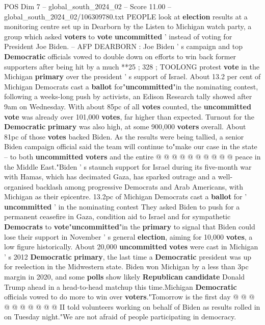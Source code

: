\begin{textsample}{POS Dim 7 – global\_south\_2024\_02 – Score 11.00 – global\_south\_2024\_02/106309780.txt}  \label{ex:f7_pos_197}
PEOPLE look at \textbf{election} results at a monitoring centre set up in Dearborn by the Listen to Michigan watch party, a group which asked \textbf{voters} to \textbf{vote} \textbf{uncommitted} ' instead of voting for President Joe Biden. -- AFP DEARBORN : Joe Biden ' s campaign and top \textbf{Democratic} officials vowed to double down on efforts to win back former supporters after being hit by a much **25 ; 328 ; TOOLONG protest \textbf{vote} in the Michigan \textbf{primary} over the president ' s support of Israel.
About 13.2 per cent of Michigan Democrats cast a \textbf{ballot} for"\textbf{uncommitted}"in the nominating contest, following a weeks-long push by activists, an Edison Research tally showed after 9am on Wednesday.
With about 85pc of all \textbf{votes} counted, the \textbf{uncommitted} \textbf{vote} was already over 101,000 \textbf{votes}, far higher than expected.
Turnout for the \textbf{Democratic} \textbf{primary} was also high, at some 900,000 \textbf{voters} overall.
About 81pc of those \textbf{votes} backed Biden.
As the results were being tallied, a senior Biden campaign official said the team will continue to"make our case in the state -- to both \textbf{uncommitted} \textbf{voters} and the entire @ @ @ @ @ @ @ @ @ @ peace in the Middle East."Biden ' s staunch support for Israel during its five-month war with Hamas, which has decimated Gaza, has sparked outrage and a well-organised backlash among progressive Democrats and Arab Americans, with Michigan as their epicentre. 13.2pc of Michigan Democrats cast a \textbf{ballot} for ' \textbf{uncommitted} ' in the nominating contest They asked Biden to push for a permanent ceasefire in Gaza, condition aid to Israel and for sympathetic \textbf{Democrats} to \textbf{vote}"\textbf{uncommitted}"in the \textbf{primary} to signal that Biden could lose their support in November ' s general \textbf{election}, aiming for 10,000 \textbf{votes}, a low figure historically.
About 20,000 \textbf{uncommitted} \textbf{votes} were cast in Michigan ' s 2012 \textbf{Democratic} \textbf{primary}, the last time a \textbf{Democratic} president was up for reelection in the Midwestern state.
Biden won Michigan by a less than 3pc margin in 2020, and some \textbf{polls} show likely \textbf{Republican} \textbf{candidate} Donald Trump ahead in a head-to-head matchup this time.Michigan \textbf{Democratic} officials vowed to do more to win over \textbf{voters}."Tomorrow is the first day @ @ @ @ @ @ @ @ @ @ II told volunteers working on behalf of Biden as results rolled in on Tuesday night."We are not afraid of people participating in democracy.

\end{textsample}
